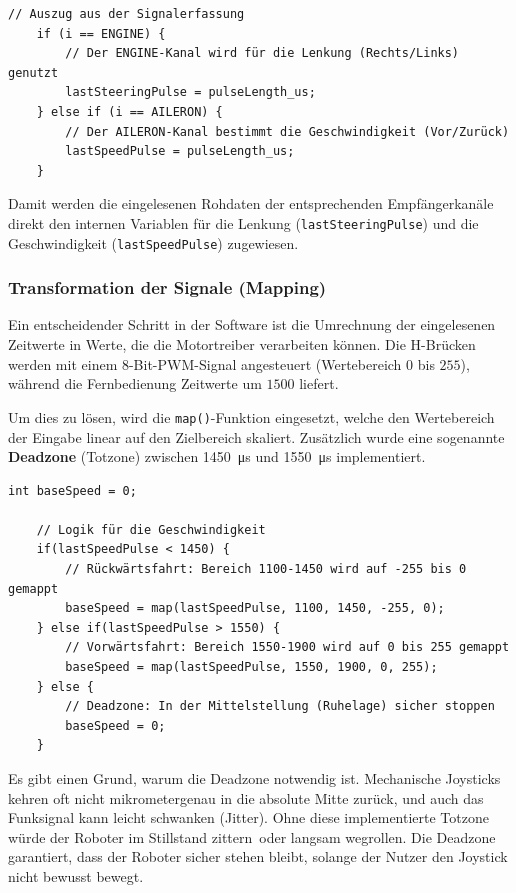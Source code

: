 \begin{lstlisting}[style=motorStyle, caption={Einlesen und Zuordnen der RC-Signale}]
	// Auszug aus der Signalerfassung
	if (i == ENGINE) {
		// Der ENGINE-Kanal wird für die Lenkung (Rechts/Links) genutzt
		lastSteeringPulse = pulseLength_us;
	} else if (i == AILERON) {
		// Der AILERON-Kanal bestimmt die Geschwindigkeit (Vor/Zurück)
		lastSpeedPulse = pulseLength_us;
	}
\end{lstlisting}
Damit werden die eingelesenen Rohdaten der entsprechenden Empfängerkanäle direkt den internen Variablen für die Lenkung (\texttt{lastSteeringPulse}) und die Geschwindigkeit (\texttt{lastSpeedPulse}) zugewiesen.


\subsubsection{Transformation der Signale (Mapping)}
Ein entscheidender Schritt in der Software ist die Umrechnung der eingelesenen Zeitwerte in Werte, die die Motortreiber verarbeiten können. Die H-Brücken werden mit einem 8-Bit-PWM-Signal angesteuert (Wertebereich $0$ bis $255$), während die Fernbedienung Zeitwerte um $1500$ liefert.

Um dies zu lösen, wird die \texttt{map()}-Funktion eingesetzt, welche den Wertebereich der Eingabe linear auf den Zielbereich skaliert. Zusätzlich wurde eine sogenannte \textbf{Deadzone} (Totzone) zwischen \SI{1450}{\micro\second} und \SI{1550}{\micro\second} implementiert.

\begin{lstlisting}[style=motorStyle, caption={Mapping der Rohdaten mit Totzone}]
	int baseSpeed = 0;
	
	// Logik für die Geschwindigkeit
	if(lastSpeedPulse < 1450) {
		// Rückwärtsfahrt: Bereich 1100-1450 wird auf -255 bis 0 gemappt
		baseSpeed = map(lastSpeedPulse, 1100, 1450, -255, 0);
	} else if(lastSpeedPulse > 1550) {
		// Vorwärtsfahrt: Bereich 1550-1900 wird auf 0 bis 255 gemappt
		baseSpeed = map(lastSpeedPulse, 1550, 1900, 0, 255);
	} else {
		// Deadzone: In der Mittelstellung (Ruhelage) sicher stoppen
		baseSpeed = 0;
	}
\end{lstlisting}

Es gibt einen Grund, warum die Deadzone notwendig ist. Mechanische Joysticks kehren oft nicht mikrometergenau in die absolute Mitte zurück, und auch das Funksignal kann leicht schwanken (Jitter). Ohne diese implementierte Totzone würde der Roboter im Stillstand \glqq zittern\grqq ~oder langsam wegrollen. Die Deadzone garantiert, dass der Roboter sicher stehen bleibt, solange der Nutzer den Joystick nicht bewusst bewegt.

